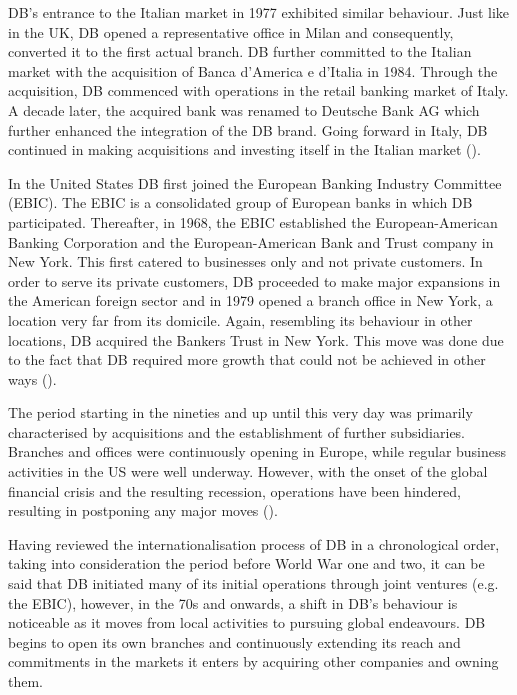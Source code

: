 \documentclass[11pt,a4paper]{article}
\begin{document}
{{DB's entrance to the Italian market in 1977 exhibited similar behaviour. Just like in the UK, DB opened a representative office in Milan and consequently, converted it to the first actual branch. DB further committed to the Italian market with the acquisition of Banca d'America e d'Italia in 1984. Through the acquisition, DB commenced with operations in the retail banking market of Italy. A decade later, the acquired bank was renamed to Deutsche Bank AG which further enhanced the integration of the DB brand. %
Going forward in Italy, DB continued in making acquisitions and investing itself in the Italian market (\cite{deutschebankagDeutscheBankItaly}). \par
In the United States DB first joined the European Banking Industry Committee (EBIC). The EBIC is a consolidated group of European banks in which DB participated. Thereafter, in 1968, the EBIC established the European-American Banking Corporation and the European-American Bank and Trust company in New York. This first catered to businesses only and not private customers. 
In order to serve its private customers, DB proceeded to make major expansions in the American foreign sector and in 1979 opened a branch office in New York, a location very far from its domicile. Again, resembling its behaviour in other locations, DB acquired the Bankers Trust in New York. This move was done due to the fact that DB required more growth that could not be achieved in other ways (\cite{deutschebankagDeutscheBankUS}).   \par
The period starting in the nineties and up until this very day was primarily characterised by acquisitions and the establishment of further subsidiaries. Branches and offices were continuously opening in Europe, while regular business activities in the US were well underway. However, with the onset of the global financial crisis and the resulting recession, operations have been hindered, resulting in postponing any major moves (\cite{deutschebankagDeutscheBank1870}).  \par
Having reviewed the internationalisation process of DB in a chronological order, taking into consideration the period before World War one and two, it can be said that DB initiated many of its initial operations through joint ventures (e.g. the EBIC), however, in the 70s and onwards, a shift in DB's behaviour is noticeable as it moves from local activities to pursuing global endeavours. DB begins to open its own branches and continuously extending its reach and commitments in the markets it enters by acquiring other companies and owning them. \par
}}
\end{document}
